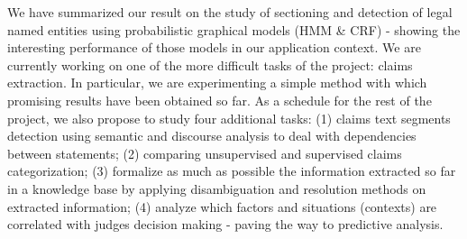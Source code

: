 \documentclass[runningheads,a4paper]{llncs}
\begin{document}
We have summarized our result on the study of sectioning and detection of legal named entities using probabilistic graphical models (HMM \& CRF) - showing the interesting performance of those models in our application context. We are currently working on one of the more difficult tasks of the project: claims extraction. In particular, we are experimenting a simple method with which promising results have been obtained so far. %
As a schedule for the rest of the project, we also propose to study four additional tasks: (1) claims text segments detection using semantic and discourse analysis to deal with dependencies between statements; (2) comparing unsupervised and supervised claims categorization; (3) formalize as much as possible the information extracted so far in a knowledge base by applying disambiguation and resolution methods on extracted information; (4) analyze which factors and situations (contexts) are correlated with judges decision making - paving the way to predictive analysis. %
\end{document}
